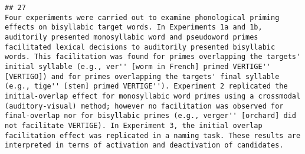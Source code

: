\documentclass[
  english,
  man]{apa6}
\begin{document}
\begin{verbatim}
## 27                                                                                                                                                                                                                                                                                                                                                                                                                                                                                                                                                                                                                                                                                                                                                                                                                                                                                                                                                                                                                                                                                                                                                                                                                                                                                                                                                                                                                                                                                                                                                                                                                                                                                                        Four experiments were carried out to examine phonological priming effects on bisyllabic target words. In Experiments 1a and 1b, auditorily presented monosyllabic word and pseudoword primes facilitated lexical decisions to auditorily presented bisyllabic words. This facilitation was found for primes overlapping the targets' initial syllable (e.g., ver'' [worm in French] primed VERTIGE'' [VERTIGO]) and for primes overlapping the targets' final syllable (e.g., tige'' [stem] primed VERTIGE''). Experiment 2 replicated the initial-overlap effect for monosyllabic word primes using a crossmodal (auditory-visual) method; however no facilitation was observed for final-overlap nor for bisyllabic primes (e.g., verger'' [orchard] did not facilitate VERTIGE). In Experiment 3, the initial overlap facilitation effect was replicated in a naming task. These results are interpreted in terms of activation and deactivation of candidates.

\end{verbatim}
\end{document}
